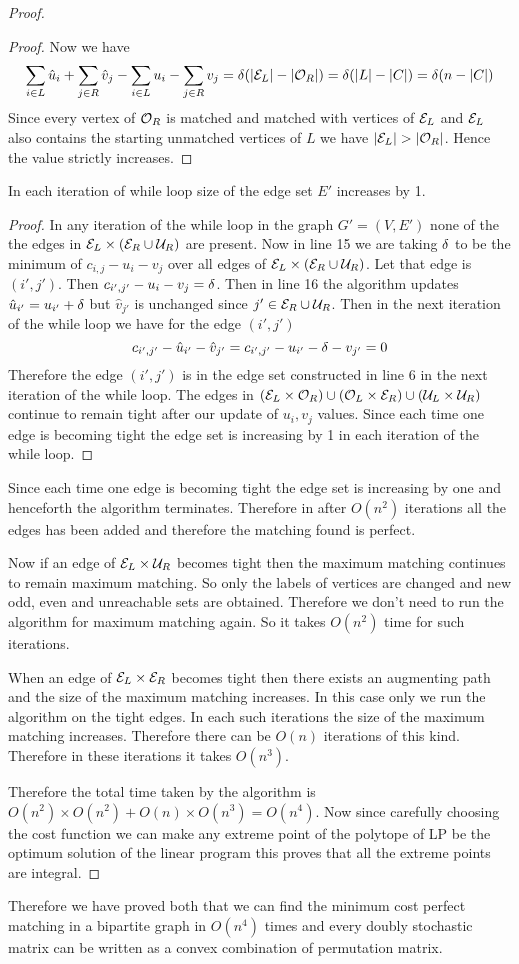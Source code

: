\begin{proof}
\begin{claimwidth}
\begin{proof}
			Now we have $$
			\sum\limits_{i\in L}\hat{u}_i+\sum\limits_{j\in R}\hat{v}_j-\sum\limits_{i\in L}u_i-\sum\limits_{j\in R}v_j=\delta(|\mathcal{E}_L|-|\mathcal{O}_R|)=\delta(|L|-|C|)=\delta(n-|C|)$$
			Since every vertex of $\mathcal{O}_R$ is matched and matched with vertices of $\mathcal{E}_L$ and $\mathcal{E}_L$ also contains the starting unmatched vertices of $L$ we have $|\mcE_L|>|\mcO_R|$. Hence the value strictly increases.
		\end{proof}
		\begin{claim}{}{}
			In each iteration of while loop size of the edge set $E'$ increases by 1.
		\end{claim}
		\begin{proof}
			In any iteration of the while loop in the graph $G'=(V,E')$ none of the the edges in $\mathcal{E}_L\times (\mathcal{E}_R\cup \mathcal{U}_R)$ are present. Now in line 15 we are taking $\delta$ to be the minimum of $c_{i,j}-u_i-v_j$ over all edges of $\mathcal{E}_L\times (\mathcal{E}_R\cup \mathcal{U}_R)$. Let that edge is $(i',j')$. Then $c_{i',j'}-u_i-v_j=\delta$. Then in line 16 the algorithm updates $\hat{u}_{i'}=u_{i'}+\delta$ but $\hat{v}_{j'}$ is unchanged since $j'\in \mathcal{E}_R\cup\mathcal{U}_R$. Then in the next iteration of the while loop we have for the edge $(i',j')$ $$c_{i',j'}-\hat{u}_{i'}-\hat{v}_{j'}=c_{i',j'}-u_{i'}-\delta-v_{j'}=0$$Therefore the edge $(i',j')$ is in the edge set constructed in line 6 in the next iteration of the while loop. The edges in $(\mathcal{E}_L\times \mathcal{O}_R)\cup (\mathcal{O}_L\times \mathcal{E}_R)\cup (\mathcal{U}_L\times \mathcal{U}_R)$ continue to remain tight after our update of $u_i,v_j$ values. Since each time one edge is becoming tight the edge set is increasing by 1 in each iteration of the while loop.
		\end{proof}
	\end{claimwidth}
	Since each time one edge is becoming tight the edge set is increasing by one and henceforth the algorithm terminates. Therefore in after $O(n^2)$  iterations all the edges has been added and therefore the  matching found is perfect. 

Now if an edge of $\mathcal{E}_L\times\mathcal{U}_R$ becomes tight then the maximum matching continues to remain maximum matching. So only the labels of vertices are changed and new odd, even and unreachable sets are obtained. Therefore we don't need to run the algorithm for maximum matching again.  So it takes $O(n^2)$ time for such iterations. 

When an edge of $\mathcal{E}_L\times\mathcal{E}_R$ becomes tight then there exists an augmenting path and the size of the maximum matching increases. In this case only we run the  algorithm on the tight edges. In each such iterations  the size of the maximum matching increases. Therefore there can be $O(n)$ iterations of this kind. Therefore in these iterations it takes $O(n^3)$. 

Therefore the total time taken by the algorithm is $O(n^2)\times O(n^2)+O(n)\times O(n^3)=O(n^4)$. Now since carefully choosing the cost function we can make any extreme point of the polytope of LP be the optimum solution of the linear program this proves that all the extreme points are integral.
\end{proof}

Therefore we have proved both that we can find the minimum cost perfect matching in a bipartite graph in $O(n^4)$ times and every doubly stochastic matrix can be written as a convex combination of permutation matrix.


